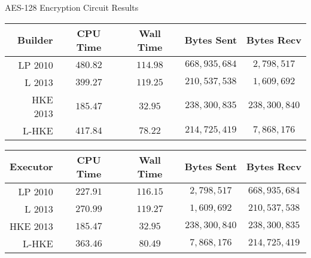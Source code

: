 \documentclass[t, 12pt]{beamer}            %
\begin{document}
\begin{frame}
	\begin{block}{AES-128 Encryption Circuit Results}
		\begin{tabular}{| r | c c c c |}
		\hline
		\textbf{Builder} & \textbf{CPU Time} & \textbf{Wall Time} & \textbf{Bytes Sent} & \textbf{Bytes Recv} \\
		\hline
		\hline
		LP 2010 & $480.82$ & $114.98$ & $668,935,684$ & $2,798,517$ \\
		\hline
		L 2013 & $399.27$ & $119.25$ & $210,537,538$ & $1,609,692$ \\
		\hline
		HKE 2013 & $185.47$ & $32.95$ & $238,300,835$ & $238,300,840$ \\
		\hline
		L-HKE & $417.84$ & $78.22$ & $214,725,419$ & $7,868,176$ \\
		\hline
		\end{tabular}

		\vspace{0.2cm}

		\begin{tabular}{| r | c c c c |}
		\hline
		\textbf{Executor} & \textbf{CPU Time} & \textbf{Wall Time} & \textbf{Bytes Sent} & \textbf{Bytes Recv} \\
		\hline
		\hline
		LP 2010 & $227.91$ & $116.15$ & $2,798,517$ & $668,935,684$ \\
		\hline
		L 2013 & $270.99$ & $119.27$ & $1,609,692$ & $210,537,538$ \\
		\hline
		HKE 2013 & $185.47$ & $32.95$ & $238,300,840$ & $238,300,835$ \\
		\hline
		L-HKE & $363.46$ & $80.49$ & $7,868,176$ & $214,725,419$ \\
		\hline
		\end{tabular}
	\end{block}


\end{frame}
\end{document}
